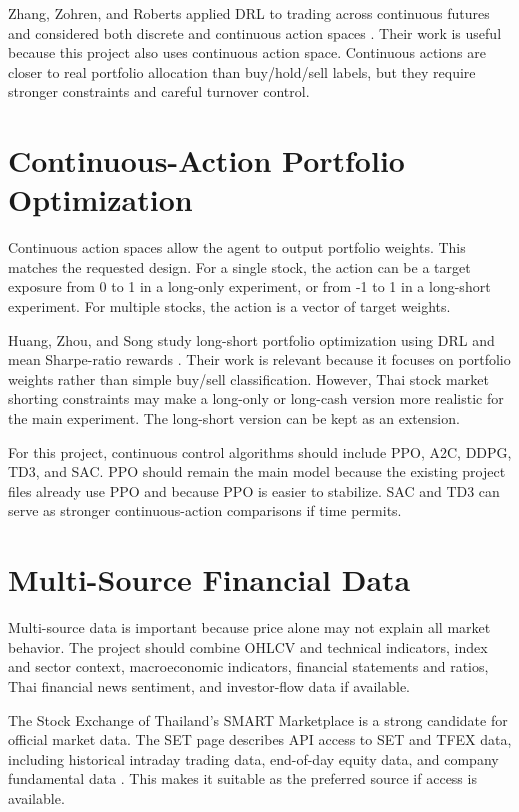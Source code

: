 \documentclass[11pt]{article}
\begin{document}
Zhang, Zohren, and Roberts applied DRL to trading across continuous futures and considered both discrete and continuous action spaces \cite{zhangtrading}. Their work is useful because this project also uses continuous action space. Continuous actions are closer to real portfolio allocation than buy/hold/sell labels, but they require stronger constraints and careful turnover control.

\section{Continuous-Action Portfolio Optimization}
Continuous action spaces allow the agent to output portfolio weights. This matches the requested design. For a single stock, the action can be a target exposure from 0 to 1 in a long-only experiment, or from -1 to 1 in a long-short experiment. For multiple stocks, the action is a vector of target weights.

Huang, Zhou, and Song study long-short portfolio optimization using DRL and mean Sharpe-ratio rewards \cite{longshort}. Their work is relevant because it focuses on portfolio weights rather than simple buy/sell classification. However, Thai stock market shorting constraints may make a long-only or long-cash version more realistic for the main experiment. The long-short version can be kept as an extension.

For this project, continuous control algorithms should include PPO, A2C, DDPG, TD3, and SAC. PPO should remain the main model because the existing project files already use PPO and because PPO is easier to stabilize. SAC and TD3 can serve as stronger continuous-action comparisons if time permits.

\section{Multi-Source Financial Data}
Multi-source data is important because price alone may not explain all market behavior. The project should combine OHLCV and technical indicators, index and sector context, macroeconomic indicators, financial statements and ratios, Thai financial news sentiment, and investor-flow data if available.

The Stock Exchange of Thailand's SMART Marketplace is a strong candidate for official market data. The SET page describes API access to SET and TFEX data, including historical intraday trading data, end-of-day equity data, and company fundamental data \cite{setsmart}. This makes it suitable as the preferred source if access is available.
\end{document}
